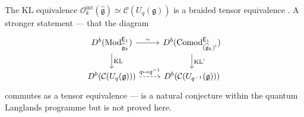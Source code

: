 \begin{remark}\label{rem:km-categorical-refinement}
The KL equivalence $\mathcal{O}_k^{\mathrm{int}}(\widehat{\mathfrak{g}}) \simeq \mathcal{C}(U_q(\mathfrak{g}))$ is a braided tensor equivalence \cite{KL93}.  A stronger statement --- that the diagram
\[
\begin{tikzcd}
D^b(\mathrm{Mod}_{\widehat{\mathfrak{g}}_k}^{\Eone}) \arrow[r, "\sim"] \arrow[d, "\mathrm{KL}"] &
D^b(\mathrm{Comod}_{(\widehat{\mathfrak{g}}_k)^!}^{\Eone}) \arrow[d, "\mathrm{KL}'"] \\
D^b(\mathcal{C}(U_q(\mathfrak{g}))) \arrow[r, dashed, "q \mapsto q^{-1}"] &
D^b(\mathcal{C}(U_{q^{-1}}(\mathfrak{g})))
\end{tikzcd}
\]
commutes as a tensor equivalence --- is a natural conjecture within the quantum Langlands programme but is not proved here.
\end{remark}


